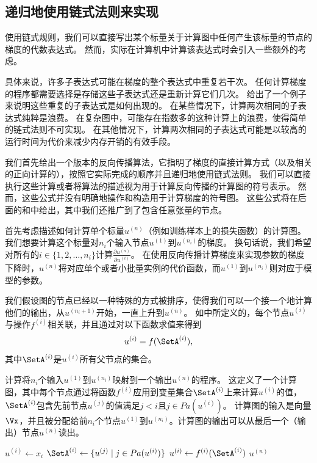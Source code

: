 \subsection{递归地使用链式法则来实现}
\label{sec:recursively_applying_the_chain_rule_to_obtain_backprop}

使用链式规则，我们可以直接写出某个标量关于计算图中任何产生该标量的节点的梯度的代数表达式。
然而，实际在计算机中计算该表达式时会引入一些额外的考虑。

具体来说，许多子表达式可能在梯度的整个表达式中重复若干次。
任何计算梯度的程序都需要选择是存储这些子表达式还是重新计算它们几次。
给出了一个例子来说明这些重复的子表达式是如何出现的。
在某些情况下，计算两次相同的子表达式纯粹是浪费。
在复杂图中，可能存在指数多的这种计算上的浪费，使得简单的链式法则不可实现。
在其他情况下，计算两次相同的子表达式可能是以较高的运行时间为代价来减少内存开销的有效手段。

我们首先给出一个版本的反向传播算法，它指明了梯度的直接计算方式（以及相关的正向计算的），按照它实际完成的顺序并且递归地使用链式法则。
我们可以直接执行这些计算或者将算法的描述视为用于计算反向传播的计算图的符号表示。
然而，这些公式并没有明确地操作和构造用于计算梯度的符号图。
这些公式将在后面的和中给出，其中我们还推广到了包含任意张量的节点。

首先考虑描述如何计算单个标量$u^{(n)}$（例如训练样本上的损失函数）的计算图。
我们想要计算这个标量对$n_i$个输入节点$u^{(1)}$到$u^{(n_i)}$的梯度。
换句话说，我们希望对所有的$i\in\{1,2,\ldots,n_i\}$计算$\frac{\partial u^{(n)}}{\partial u^{(i)}}$。
在使用反向传播计算梯度来实现参数的梯度下降时，$u^{(n)}$将对应单个或者小批量实例的代价函数，而$u^{(1)}$到$u^{(n_i)}$则对应于模型的参数。


我们假设图的节点已经以一种特殊的方式被排序，使得我们可以一个接一个地计算他们的输出，从$u^{(n_i+1)}$开始，一直上升到$u^{(n)}$。
如中所定义的，每个节点$u^{(i)}$与操作$f^{(i)}$相关联，并且通过对以下函数求值来得到
\begin{equation}
  u^{(i)} = f(\SetA^{(i)}),
\end{equation}
其中$\SetA^{(i)}$是$u^{(i)}$所有父节点的集合。
\begin{algorithm}[htbp]
\caption{计算将$n_i$个输入$u^{(1)}$到$u^{(n_i)}$映射到一个输出$u^{(n)}$的程序。
这定义了一个计算图，其中每个节点通过将函数$f^{(i)}$应用到变量集合$\SetA^{(i)}$上来计算$u^{(i)}$的值，$\SetA^{(i)}$包含先前节点$u^{(j)}$的值满足$j<i$且$j \in Pa(u^{(i)})$。
计算图的输入是向量$\Vx$，并且被分配给前$n_i$个节点$u^{(1)}$到$u^{(n_i)}$。计算图的输出可以从最后一个（输出）节点$u^{(n)}$读出。}
\label{alg:fprop}
\begin{algorithmic}
 \STATE $u^{(i)} \leftarrow x_i$
\ENDFOR
{}
 \STATE $\SetA^{(i)} \leftarrow \{ u^{(j)} \mid j \in Pa(u^{(i)}) \}$
 \STATE $u^{(i)} \leftarrow f^{(i)}(\SetA^{(i)})$
\ENDFOR
{} $u^{(n)}$
\end{algorithmic}
\end{algorithm}

